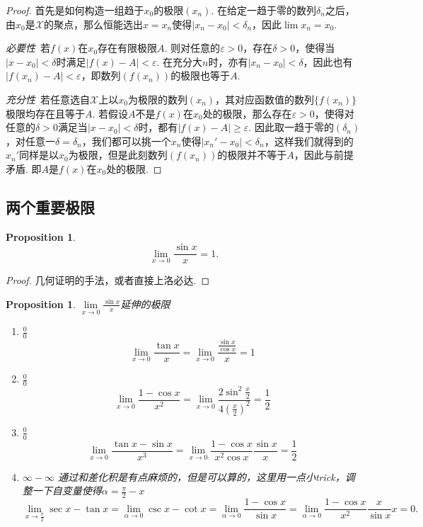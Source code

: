 \documentclass{article}
\newtheorem{proposition}[theorem]{Proposition}
\begin{document}
\begin{proof}
\rm 首先是如何构造一组趋于$x_0$的极限$(x_n)$. 在给定一趋于零的数列${\delta_n}$之后，由$x_0$是$\mathcal{X}$的聚点，那么恒能选出$x = x_n$使得$|x_n - x_0| < \delta_n$，因此$\lim x_n = x_0$. 

\emph{必要性}\ 若$f(x)$在$x_0$存在有限极限$A$. 则对任意的$\varepsilon > 0$，存在$\delta > 0$，使得当$|x-x_0| < \delta$时满足$|f(x)-A| < \varepsilon$. 在充分大$n$时，亦有$|x_n - x_0| < \delta$，因此也有$|f(x_n)-A| < \varepsilon$，即数列$(f(x_n))$的极限也等于$A$. 

\emph{充分性}\ 若任意选自$\mathcal{X}$上以$x_0$为极限的数列$(x_n)$，其对应函数值的数列$\{f(x_n)\}$极限均存在且等于$A$. 若假设$A$不是$f(x)$在$x_0$处的极限，那么存在$\varepsilon > 0$，使得对任意的$\delta > 0$满足当$|x-x_0| < \delta$时，都有$|f(x)-A| \geq \varepsilon$. 因此取一趋于零的$(\delta_n)$，对任意一$\delta = \delta_n$，我们都可以挑一个$x_n$使得$|x_n' -x_0| < \delta_n$，这样我们就得到的${x_n'}$同样是以$x_0$为极限，但是此刻数列$(f(x_n))$的极限并不等于$A$，因此与前提矛盾. 即$A$是$f(x)$在$x_0$处的极限.  
\end{proof}



\subsection{两个重要极限}

\begin{proposition}
$$
\lim\limits_{x \rightarrow 0} \frac{\sin x}{x} = 1.
$$
\end{proposition}

\begin{proof}
几何证明的手法，或者直接上洛必达.
\end{proof}

\begin{proposition}
\rm {\color{blue}$\lim\limits_{x \rightarrow 0} \frac{\sin x}{x}$延伸的极限}
\begin{enumerate}
	\item $\frac{0}{0}$
	$$
	\lim\limits_{x \rightarrow 0} \frac{\tan x}{x} = \lim\limits_{x \rightarrow 0} \frac{\frac{\sin x}{\cos x}}{x} = 1
	$$
	\item $\frac{0}{0}$
	$$
	\lim\limits_{x \rightarrow 0} \frac{1-\cos x}{x^2} = \lim\limits_{x \rightarrow 0} \frac{2\sin^2\frac{x}{2}}{4(\frac{x}{2})^2} = \frac{1}{2}
	$$
	\item $\frac{0}{0}$
	$$
	\lim\limits_{x \rightarrow 0} \frac{\tan x-\sin x}{x^3} = \lim\limits_{x \rightarrow 0} \frac{1-\cos x}{x^2\cos x}\frac{\sin x}{x} = \frac{1}{2}
	$$
	\item $\infty - \infty$ 通过和差化积是有点麻烦的，但是可以算的，这里用一点小trick，调整一下自变量使得$\alpha = \frac{\pi}{2} - x$
	$$
		\lim\limits_{x \rightarrow \frac{\pi}{2}} \sec x -\tan x = \lim\limits_{\alpha \rightarrow 0} \csc x - \cot x = \lim\limits_{\alpha \rightarrow 0} \frac{1-\cos x}{\sin x} = \lim\limits_{\alpha \rightarrow 0} \frac{1-\cos x}{x^2} \frac{x}{\sin x} x = 0.
	$$
\end{enumerate}
\end{proposition}
\end{document}
